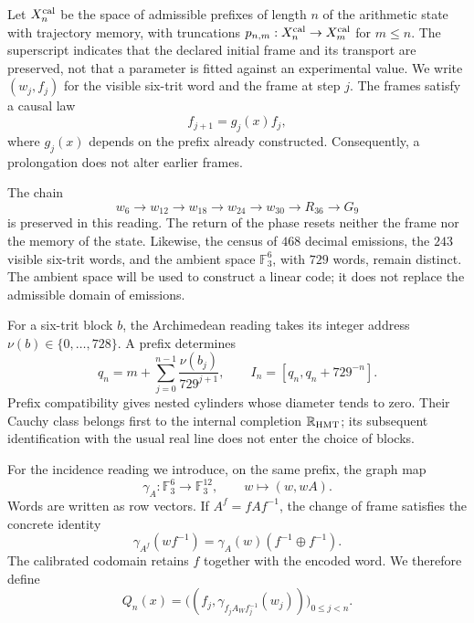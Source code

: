 Let $X_n^{\rm cal}$ be the space of admissible prefixes of length $n$ of the
arithmetic state with trajectory memory, with truncations
$p_{n,m}:X_n^{\rm cal}\to X_m^{\rm cal}$ for $m\leq n$. The superscript
indicates that the declared initial frame and its transport are preserved, not
that a parameter is fitted against an experimental value. We write
$(w_j,f_j)$ for the visible six-trit word and the frame at step
$j$. The frames satisfy a causal law
\[
 f_{j+1}=g_j(x)f_j,
\]
where $g_j(x)$ depends on the prefix already constructed. Consequently, a
prolongation does not alter earlier frames.

The chain
\[
 w_6\longrightarrow w_{12}\longrightarrow w_{18}
 \longrightarrow w_{24}\longrightarrow w_{30}
 \longrightarrow R_{36}\longrightarrow G_9
\]
is preserved in this reading. The return of the phase resets neither the
frame nor the memory of the state. Likewise, the
census of $468$ decimal emissions, the $243$ visible six-trit words, and the
ambient space $\mathbb F_3^6$, with $729$ words, remain distinct. The ambient space
will be used to construct a linear code; it does not replace the
admissible domain of emissions.

For a six-trit block $b$, the Archimedean reading takes its
integer address $\nu(b)\in\{0,\ldots,728\}$. A prefix determines
\[
 q_n=m+\sum_{j=0}^{n-1}\frac{\nu(b_j)}{729^{j+1}},
 \qquad I_n=[q_n,q_n+729^{-n}].
\]
Prefix compatibility gives nested cylinders whose diameter tends
to zero. Their Cauchy class belongs first to the internal completion
$\mathbb R_{\rm HMT}$; its subsequent identification with the usual real
line does not enter the choice of blocks.

For the incidence reading we introduce, on the same prefix, the
graph map
\begin{equation}
 \gamma_A:\mathbb F_3^6\longrightarrow\mathbb F_3^{12},
 \qquad w\longmapsto(w,wA).
 \label{exc:gamma}
\end{equation}
Words are written as row vectors. If $A^f=fAf^{-1}$, the
change of frame satisfies the concrete identity
\begin{equation}
 \gamma_{A^f}(wf^{-1})
   =\gamma_A(w)(f^{-1}\oplus f^{-1}).
 \label{exc:covariancia}
\end{equation}
The calibrated codomain retains $f$ together with the encoded word.
We therefore define
\begin{equation}
 Q_n(x)=\bigl((f_j,\gamma_{f_jA_Wf_j^{-1}}(w_j))\bigr)_{0\leq j<n}.
 \label{exc:qn}
\end{equation}

